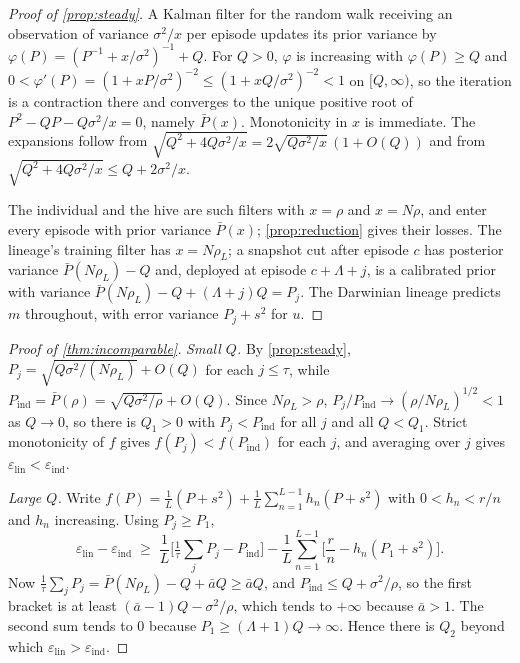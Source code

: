 \documentclass[11pt]{article}
\theoremstyle{plain}
\theoremstyle{definition}
\theoremstyle{remark}
\newcommand{\abar}{\bar a}
\newcommand{\Pbar}{\bar P}
\newcommand{\eps}{\varepsilon}
\begin{document}
\begin{proof}[Proof of \cref{prop:steady}]
A Kalman filter for the random walk receiving an observation of variance $\sigma^2/x$ per episode updates its prior variance by $\varphi(P)=(P^{-1}+x/\sigma^2)^{-1}+Q$. For $Q>0$, $\varphi$ is increasing with $\varphi(P)\ge Q$ and $0<\varphi'(P)=(1+xP/\sigma^2)^{-2}\le(1+xQ/\sigma^2)^{-2}<1$ on $[Q,\infty)$, so the iteration is a contraction there and converges to the unique positive root of $P^2-QP-Q\sigma^2/x=0$, namely $\Pbar(x)$. Monotonicity in $x$ is immediate. The expansions follow from $\sqrt{Q^2+4Q\sigma^2/x}=2\sqrt{Q\sigma^2/x}\,(1+O(Q))$ and from $\sqrt{Q^2+4Q\sigma^2/x}\le Q+2\sigma^2/x$.

The individual and the hive are such filters with $x=\rho$ and $x=N\rho$, and enter every episode with prior variance $\Pbar(x)$; \cref{prop:reduction} gives their losses. The lineage's training filter has $x=N\rho_L$; a snapshot cut after episode $c$ has posterior variance $\Pbar(N\rho_L)-Q$ and, deployed at episode $c+\Lambda+j$, is a calibrated prior with variance $\Pbar(N\rho_L)-Q+(\Lambda+j)Q=P_j$. The Darwinian lineage predicts $m$ throughout, with error variance $P_j+s^2$ for $u$.
\end{proof}

\begin{proof}[Proof of \cref{thm:incomparable}]
\emph{Small $Q$.} By \cref{prop:steady}, $P_j=\sqrt{Q\sigma^2/(N\rho_L)}+O(Q)$ for each $j\le\tau$, while $P_{\mathrm{ind}}=\Pbar(\rho)=\sqrt{Q\sigma^2/\rho}+O(Q)$. Since $N\rho_L>\rho$, $P_j/P_{\mathrm{ind}}\to(\rho/N\rho_L)^{1/2}<1$ as $Q\to0$, so there is $Q_1>0$ with $P_j<P_{\mathrm{ind}}$ for all $j$ and all $Q<Q_1$. Strict monotonicity of $f$ gives $f(P_j)<f(P_{\mathrm{ind}})$ for each $j$, and averaging over $j$ gives $\eps_{\mathrm{lin}}<\eps_{\mathrm{ind}}$.

\emph{Large $Q$.} Write $f(P)=\frac1L(P+s^2)+\frac1L\sum_{n=1}^{L-1}h_n(P+s^2)$ with $0<h_n<r/n$ and $h_n$ increasing. Using $P_j\ge P_1$,
\[
\eps_{\mathrm{lin}}-\eps_{\mathrm{ind}}\;\ge\;\frac1L\Big[\tfrac1\tau\textstyle\sum_jP_j-P_{\mathrm{ind}}\Big]-\frac1L\sum_{n=1}^{L-1}\Big[\frac rn-h_n(P_1+s^2)\Big].
\]
Now $\frac1\tau\sum_jP_j=\Pbar(N\rho_L)-Q+\abar Q\ge\abar Q$, and $P_{\mathrm{ind}}\le Q+\sigma^2/\rho$, so the first bracket is at least $(\abar-1)Q-\sigma^2/\rho$, which tends to $+\infty$ because $\abar>1$. The second sum tends to $0$ because $P_1\ge(\Lambda+1)Q\to\infty$. Hence there is $Q_2$ beyond which $\eps_{\mathrm{lin}}>\eps_{\mathrm{ind}}$.
\end{proof}
\end{document}
